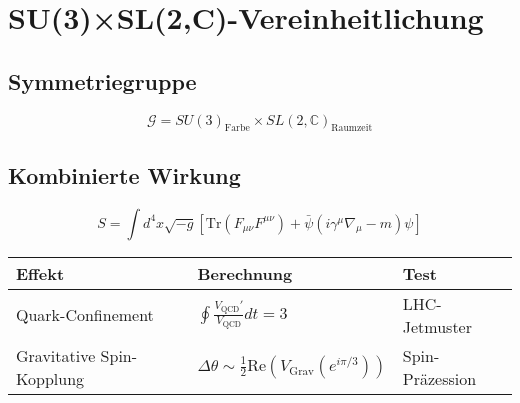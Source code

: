 \section{SU(3)×SL(2,C)-Vereinheitlichung}

\subsection{Symmetriegruppe}
\[
\mathcal{G} = SU(3)_{\text{Farbe}} \times SL(2,\mathbb{C})_{\text{Raumzeit}}
\]

\subsection{Kombinierte Wirkung}
\[
S = \int d^4x \sqrt{-g} \left[ 
\text{Tr}(F_{\mu\nu} F^{\mu\nu}) + 
\bar{\psi} (i \gamma^\mu \nabla_\mu - m) \psi 
\right]
\]

\begin{table}[h]
\centering
\begin{tabular}{|l|l|l|}
\hline
\textbf{Effekt} & \textbf{Berechnung} & \textbf{Test} \\ \hline
Quark-Confinement & $\oint \frac{V_{\text{QCD}}'}{V_{\text{QCD}}} dt = 3$ & LHC-Jetmuster \\ \hline
Gravitative Spin-Kopplung & $\Delta \theta \sim \frac{1}{2} \text{Re}(V_{\text{Grav}}(e^{i\pi/3}))$ & Spin-Präzession \\ \hline
\end{tabular}
\end{table}